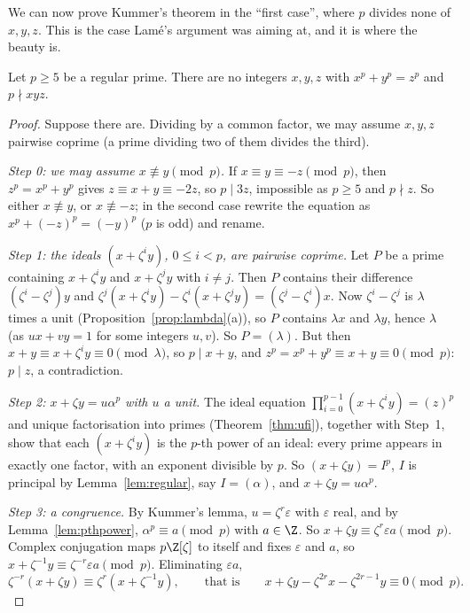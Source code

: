 We can now prove Kummer's theorem in the ``first case'', where $p$ divides none of $x,y,z$. This is the case Lamé's
argument was aiming at, and it is where the beauty is.

\begin{theorem}[Kummer, 1847]\label{thm:fltfirst}
Let $p\ge5$ be a regular prime. There are no integers $x,y,z$ with $x^p+y^p=z^p$ and $p\nmid xyz$.
\end{theorem}
\begin{proof}
Suppose there are. Dividing by a common factor, we may assume $x,y,z$ pairwise coprime (a prime dividing two of them divides
the third).

\emph{Step 0: we may assume $x\not\equiv y\pmod p$.} If $x\equiv y\equiv-z\pmod p$, then $z^p=x^p+y^p$ gives $z\equiv x+y
\equiv-2z$, so $p\mid3z$, impossible as $p\ge5$ and $p\nmid z$. So either $x\not\equiv y$, or $x\not\equiv-z$; in the second
case rewrite the equation as $x^p+(-z)^p=(-y)^p$ ($p$ is odd) and rename.

\emph{Step 1: the ideals $(x+\zeta^iy)$, $0\le i<p$, are pairwise coprime.} Let $P$ be a prime containing $x+\zeta^iy$ and
$x+\zeta^jy$ with $i\ne j$. Then $P$ contains their difference $(\zeta^i-\zeta^j)y$ and $\zeta^j(x+\zeta^iy)-\zeta^i(x+
\zeta^jy)=(\zeta^j-\zeta^i)x$. Now $\zeta^i-\zeta^j$ is $\lambda$ times a unit (Proposition~\ref{prop:lambda}(a)), so $P$
contains $\lambda x$ and $\lambda y$, hence $\lambda$ (as $ux+vy=1$ for some integers $u,v$). So $P=(\lambda)$. But then
$x+y\equiv x+\zeta^iy\equiv0\pmod\lambda$, so $p\mid x+y$, and $z^p=x^p+y^p\equiv x+y\equiv0\pmod p$: $p\mid z$, a
contradiction.

\emph{Step 2: $x+\zeta y=u\alpha^p$ with $u$ a unit.} The ideal equation $\prod_{i=0}^{p-1}(x+\zeta^iy)=(z)^p$ and unique
factorisation into primes (Theorem~\ref{thm:ufi}), together with Step~1, show that each $(x+\zeta^iy)$ is the $p$-th power of an
ideal: every prime appears in exactly one factor, with an exponent divisible by $p$. So $(x+\zeta y)=I^p$, $I$ is principal
by Lemma~\ref{lem:regular}, say $I=(\alpha)$, and $x+\zeta y=u\alpha^p$.

\emph{Step 3: a congruence.} By Kummer's lemma, $u=\zeta^r\varepsilon$ with $\varepsilon$ real, and by
Lemma~\ref{lem:pthpower}, $\alpha^p\equiv a\pmod p$ with $a\in\Z$. So $x+\zeta y\equiv\zeta^r\varepsilon a\pmod p$. Complex
conjugation maps $p\Z[\zeta]$ to itself and fixes $\varepsilon$ and $a$, so $x+\zeta^{-1}y\equiv\zeta^{-r}\varepsilon a\pmod
p$. Eliminating $\varepsilon a$,
\[
\zeta^{-r}(x+\zeta y)\equiv\zeta^r(x+\zeta^{-1}y),\qquad\text{that is}\qquad
x+\zeta y-\zeta^{2r}x-\zeta^{2r-1}y\equiv0\pmod p.\tag{$*$}
\]


\end{proof}

